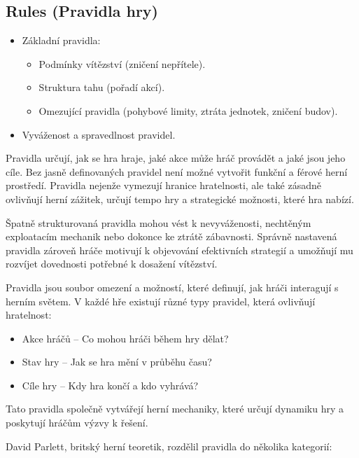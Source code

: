 \subsection{Rules (Pravidla hry)}
\begin{itemize}
    \item Základní pravidla:
    \begin{itemize}
        \item Podmínky vítězství (zničení nepřítele).
        \item Struktura tahu (pořadí akcí).
        \item Omezující pravidla (pohybové limity, ztráta jednotek, zničení budov).
    \end{itemize}
    \item Vyváženost a spravedlnost pravidel.
\end{itemize}

Pravidla určují, jak se hra hraje, jaké akce může hráč provádět a jaké jsou jeho cíle. Bez jasně definovaných pravidel není možné vytvořit funkční a férové herní prostředí. Pravidla nejenže vymezují hranice hratelnosti, ale také zásadně ovlivňují herní zážitek, určují tempo hry a strategické možnosti, které hra nabízí.

Špatně strukturovaná pravidla mohou vést k nevyváženosti, nechtěným exploatacím mechanik nebo dokonce ke ztrátě zábavnosti. Správně nastavená pravidla zároveň hráče motivují k objevování efektivních strategií a umožňují mu rozvíjet dovednosti potřebné k dosažení vítězství.


Pravidla jsou soubor omezení a možností, které definují, jak hráči interagují s herním světem. V každé hře existují různé typy pravidel, která ovlivňují hratelnost:

\begin{itemize}
    \item Akce hráčů -- Co mohou hráči během hry dělat?
    \item Stav hry -- Jak se hra mění v průběhu času?
    \item Cíle hry -- Kdy hra končí a kdo vyhrává?
\end{itemize}
Tato pravidla společně vytvářejí herní mechaniky, které určují dynamiku hry a poskytují hráčům výzvy k řešení.

David Parlett, britský herní teoretik, rozdělil pravidla do několika kategorií:

